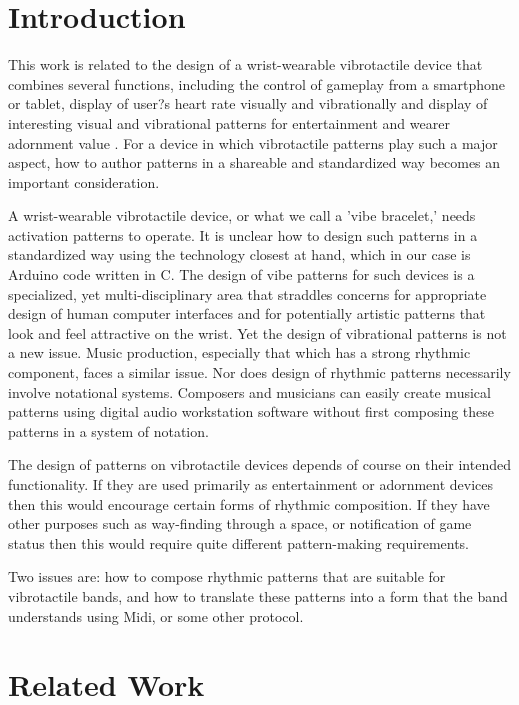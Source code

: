 \documentclass[a4paper, twocolumn]{article}
\begin{document}
\section{Introduction}
This work is related to the design of a wrist-wearable vibrotactile device that combines several functions, including the control of gameplay from a smartphone or tablet, display of user?s heart rate visually and vibrationally and display of interesting visual and vibrational patterns for entertainment and wearer adornment value \cite{tindale2014wearable}. For a device in which vibrotactile patterns play such a major aspect, how to author patterns in a shareable and standardized way becomes an important consideration. 

A wrist-wearable vibrotactile device, or what we call a 'vibe bracelet,' needs activation patterns to operate. It is unclear how to design such patterns in a standardized way using the technology closest at hand, which in our case is Arduino code written in C. The design of vibe patterns for such devices is a specialized, yet multi-disciplinary area that straddles concerns for appropriate design of human computer interfaces and for potentially artistic patterns that look and feel attractive on the wrist. Yet the design of vibrational patterns is not a new issue. Music production, especially that which has a strong rhythmic component, faces a similar issue. Nor does design of rhythmic patterns necessarily involve notational systems. Composers and musicians can easily create musical patterns using digital audio workstation software without first composing these patterns in a system of notation. 

The design of patterns on vibrotactile devices depends of course on their intended functionality. If they are used primarily as entertainment or adornment devices then this would encourage certain forms of rhythmic composition. If they have other purposes such as way-finding through a space, or notification of game status then this  would require quite different pattern-making requirements. 

Two issues are: how to compose rhythmic patterns that are suitable for vibrotactile bands, and how to translate these patterns into a form that the band understands using Midi, or some other protocol.

\section{Related Work}
\end{document}
